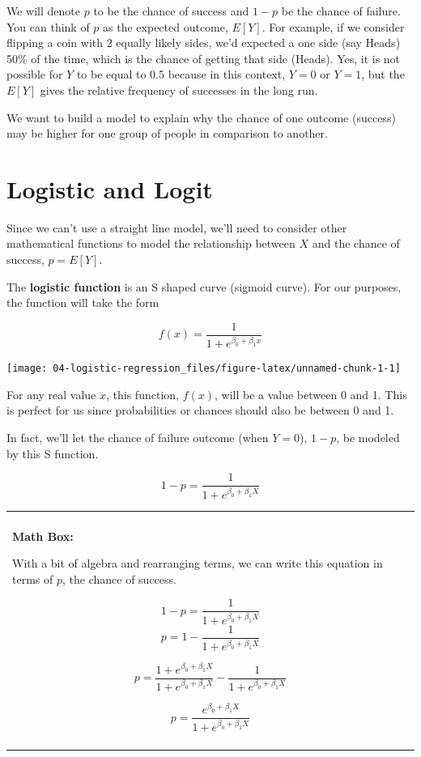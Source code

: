 \documentclass[
]{book}
\newenvironment{mathbox}
{
    \begin{center}
    
    \begin{tabular}{|p{0.8\textwidth}|}
    \rowcolor{LightYellow}
    \hline\\
    \rowcolor{LightYellow}
    \textbf{Math Box:}
}
{
    \\\rowcolor{LightYellow}
    \\\hline
    \end{tabular} 
    \end{center}
}
\begin{document}
We will denote \(p\) to be the chance of success and \(1-p\) be the chance of failure. You can think of \(p\) as the expected outcome, \(E[Y]\). For example, if we consider flipping a coin with 2 equally likely sides, we'd expected a one side (say Heads) 50\% of the time, which is the chance of getting that side (Heads). Yes, it is not possible for \(Y\) to be equal to 0.5 because in this context, \(Y=0\) or \(Y=1\), but the \(E[Y]\) gives the relative frequency of successes in the long run.

We want to build a model to explain why the chance of one outcome (success) may be higher for one group of people in comparison to another.

\hypertarget{logistic-and-logit}{%
\section{Logistic and Logit}\label{logistic-and-logit}}

Since we can't use a straight line model, we'll need to consider other mathematical functions to model the relationship between \(X\) and the chance of success, \(p=E[Y]\).

The \textbf{logistic function} is an S shaped curve (sigmoid curve). For our purposes, the function will take the form

\[f(x) = \frac{1}{1 + e^{\beta_0 +\beta_1x}}\]

\begin{center}\texttt{[image: 04-logistic-regression\_files/figure-latex/unnamed-chunk-1-1]} \end{center}

For any real value \(x\), this function, \(f(x)\), will be a value between 0 and 1. This is perfect for us since probabilities or chances should also be between 0 and 1.

In fact, we'll let the chance of failure outcome (when \(Y=0\)), \(1-p\), be modeled by this S function.

\[1-p = \frac{1}{1 + e^{\beta_0 +\beta_1X}}\]

\begin{mathbox}
With a bit of algebra and rearranging terms, we can write this equation
in terms of \(p\), the chance of success.

\[1-p = \frac{1}{1 + e^{\beta_0 +\beta_1X}}\]
\[p = 1-\frac{1}{1 + e^{\beta_0 +\beta_1X}}\]

\[p = 
\frac{1 + e^{\beta_0 +\beta_1X}}{1 + e^{\beta_0 +\beta_1X}}-\frac{1}{1 + e^{\beta_0 +\beta_1X}}\]

\[p = \frac{e^{\beta_0 +\beta_1X}}{1 + e^{\beta_0 +\beta_1X}}\]
\end{mathbox}
\end{document}
